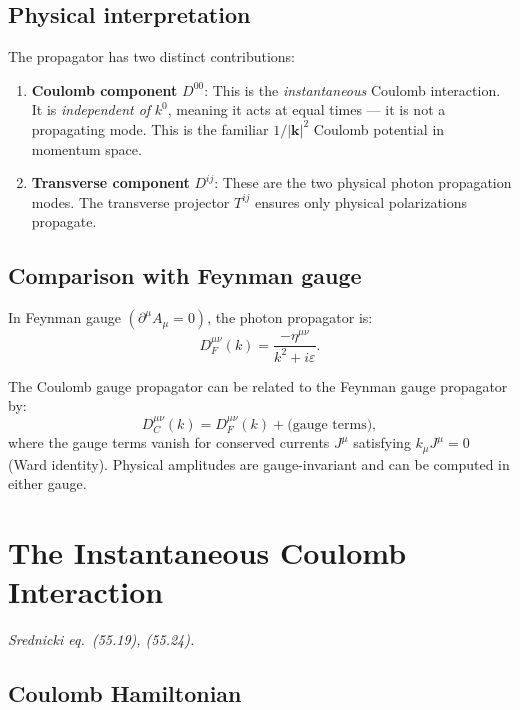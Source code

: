 \subsection{Physical interpretation}

The propagator has two distinct contributions:

\begin{enumerate}
\item \textbf{Coulomb component} $D^{00}$: This is the \emph{instantaneous} Coulomb
  interaction.  It is \emph{independent of} $k^0$, meaning it acts at equal times ---
  it is not a propagating mode.  This is the familiar $1/|\mathbf{k}|^2$ Coulomb potential
  in momentum space.

\item \textbf{Transverse component} $D^{ij}$: These are the two physical photon
  propagation modes.  The transverse projector $T^{ij}$ ensures only physical
  polarizations propagate.
\end{enumerate}

\subsection{Comparison with Feynman gauge}

In Feynman gauge $(\partial^\mu A_\mu = 0)$, the photon propagator is:
\begin{equation}\label{eq:feynman-gauge-prop}
  D_F^{\mu\nu}(k) = \frac{-\eta^{\mu\nu}}{k^2+i\varepsilon}.
\end{equation}

The Coulomb gauge propagator can be related to the Feynman gauge propagator by:
\begin{equation}
  D_C^{\mu\nu}(k) = D_F^{\mu\nu}(k) + \text{(gauge terms)},
\end{equation}
where the gauge terms vanish for conserved currents $J^\mu$ satisfying $k_\mu J^\mu=0$
(Ward identity).  Physical amplitudes are gauge-invariant and can be computed in
either gauge.

\section{The Instantaneous Coulomb Interaction}

\textit{Srednicki eq.\ (55.19), (55.24).}

\subsection{Coulomb Hamiltonian}

